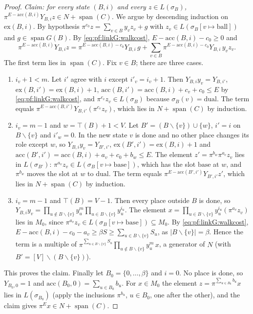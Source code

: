 \begin{proof}
\emph{Claim: for every state $(B,i)$ and every $z\in L(\sigma_B)$, $\pi^{E-\mathrm{acc}(B,i)}Y_{B,i}z\in N+\operatorname{span}(C)$.}
We argue by descending induction on $\mathrm{ex}(B,i)$. By hypothesis $\pi^{c_0}z=\sum_{v\in B}y_vz_v+g$ with
$z_v\in L(\sigma_B[v\mapsto\mathrm{ball}])$ and $g\in\operatorname{span}G(B)$. By \eqref{eq:pf:linkG:walkcost},
$E-\mathrm{acc}(B,i)-c_0\ge0$ and
\[
\pi^{E-\mathrm{acc}(B,i)}Y_{B,i}z=\pi^{E-\mathrm{acc}(B,i)-c_0}Y_{B,i}\,g+\sum_{v\in B}\pi^{E-\mathrm{acc}(B,i)-c_0}Y_{B,i}\,y_vz_v .
\]
The first term lies in $\operatorname{span}(C)$. Fix $v\in B$; there are three cases.
\begin{enumerate}[label=(\roman*)]
\item $i_v+1<m$. Let $i'$ agree with $i$ except $i'_v=i_v+1$. Then $Y_{B,i}y_v=Y_{B,i'}$,
$\mathrm{ex}(B,i')=\mathrm{ex}(B,i)+1$, $\mathrm{acc}(B,i')=\mathrm{acc}(B,i)+c_v+c_0\le E$ by \eqref{eq:pf:linkG:walkcost}, and
$\pi^{c_v}z_v\in L(\sigma_B)$ because $\sigma_B(v)=\mathrm{dual}$. The term equals
$\pi^{E-\mathrm{acc}(B,i')}Y_{B,i'}(\pi^{c_v}z_v)$, which lies in $N+\operatorname{span}(C)$ by induction.
\item $i_v=m-1$ and $w=\top(B)+1<V$. Let $B'=(B\smallsetminus\{v\})\cup\{w\}$, $i'=i$ on $B\smallsetminus\{v\}$ and $i'_w=0$. In
the new state $v$ is done and no other place changes its role except $w$, so $Y_{B,i}y_v=Y_{B',i'}$,
$\mathrm{ex}(B',i')=\mathrm{ex}(B,i)+1$ and $\mathrm{acc}(B',i')=\mathrm{acc}(B,i)+a_v+c_0+b_w\le E$. The element
$z'=\pi^{b_w}\pi^{a_v}z_v$ lies in $L(\sigma_{B'})$: $\pi^{a_v}z_v\in L(\sigma_B[v\mapsto\mathrm{base}])$, which has the slot
$\mathrm{base}$ at $w$, and $\pi^{b_w}$ moves the slot at $w$ to $\mathrm{dual}$. The term equals
$\pi^{E-\mathrm{acc}(B',i')}Y_{B',i'}z'$, which lies in $N+\operatorname{span}(C)$ by induction.
\item $i_v=m-1$ and $\top(B)=V-1$. Then every place outside $B$ is done, so
$Y_{B,i}y_v=\prod_{u\notin B\smallsetminus\{v\}}y_u^m\prod_{u\in B\smallsetminus\{v\}}y_u^{i_u}$. The element
$x=\prod_{u\in B\smallsetminus\{v\}}y_u^{i_u}(\pi^{a_v}z_v)$ lies in $M_0$, since $\pi^{a_v}z_v\in L(\sigma_B[v\mapsto\mathrm{base}])
\subseteq M_0$. By \eqref{eq:pf:linkG:walkcost}, $E-\mathrm{acc}(B,i)-c_0-a_v\ge\beta S\ge\sum_{u\in B\smallsetminus\{v\}}S_u$, as
$|B\smallsetminus\{v\}|=\beta$. Hence the term is a multiple of
$\pi^{\sum_{u\in B\smallsetminus\{v\}}S_u}\prod_{u\notin B\smallsetminus\{v\}}y_u^m\,x$, a generator of $N$ (with
$B'=[V]\smallsetminus(B\smallsetminus\{v\})$).
\end{enumerate}
This proves the claim. Finally let $B_0=\{0,\dots,\beta\}$ and $i=0$. No place is done, so $Y_{B_0,0}=1$ and
$\mathrm{acc}(B_0,0)=\sum_{u\in B_0}b_u$. For $x\in M_0$ the element $z=\pi^{\sum_{u\in B_0}b_u}x$ lies in $L(\sigma_{B_0})$
(apply the inclusions $\pi^{b_u}$, $u\in B_0$, one after the other), and the claim gives $\pi^Ex\in N+\operatorname{span}(C)$.
\end{proof}


